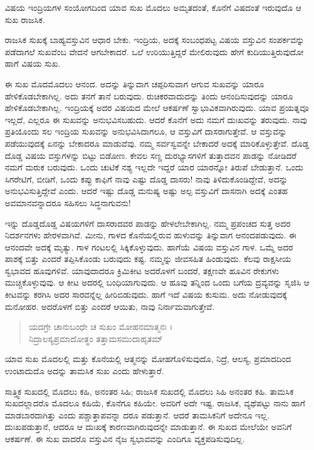 {\small ವಿಷಯ ಇಂದ್ರಿಯಗಳ ಸಂಯೋಗದಿಂದ ಯಾವ ಸುಖ ಮೊದಲು ಅಮೃತದಂತೆ, ಕೊನೆಗೆ ವಿಷದಂತೆ ಇರುವುದೊ ಆ ಸುಖ ರಾಜಸಿಕ.}

ರಾಜಸಿಕ ಸುಖಕ್ಕೆ ಬಾಹ್ಯವಸ್ತುವಿನ ಆಧಾರ ಬೇಕು. ಇಂದ್ರಿಯ, ಅದಕ್ಕೆ ಸಂಬಂಧಪಟ್ಟ ವಿಷಯ ವಸ್ತುವಿನ ಸಂಪರ್ಕವನ್ನು ಪಡೆದಾಗಲೆ ಸುಖವೆಂಬ ವೇದನೆ ಆಗಬೇಕಾದರೆ. ಒಲೆ ಉರಿಯುತ್ತಿದ್ದರೆ ಮೇಲಿರುವುದು ಹೇಗೆ ಕುದಿಯುತ್ತಿರುವುದೋ ಹಾಗೆ ವಿಷಯ ಸುಖ.

ಈ ಸುಖ ಮೊದಮೊದಲು ಆನಂದ. ಅದನ್ನು ತಿನ್ನುವಾಗ ಚಪ್ಪರಿಸುವಾಗ ಆಗುವ ಸುಖವನ್ನು ಯಾರೂ ಹೇಳಿಕೊಡಬೇಕಾಗಿಲ್ಲ. ಅದು ತನಗೆ ತಾನೆ ಬರುವುದು. ರುಚಿಕರವಾದುದನ್ನು ತಿಂದು ಆನಂದಿಸುವುದನ್ನು ಯಾರೂ ಹೇಳಿಕೊಡಬೇಕಾಗಿಲ್ಲ. ಇಂದ್ರಿಯಕ್ಕೆ ಅದರ ವಿಷಯದ ಮೇಲೆ ಆಕರ್ಷಣೆ ಸ್ವಾಭಾವಿಕವಾಗಿರುವುದು. ಯಾವ ಪ್ರಯತ್ನವೂ ಇಲ್ಲದೆ, ಎಲ್ಲರೂ ಈ ಸುಖವನ್ನು ಅನುಭವಿಸಬಹುದು. ಆದರೆ ಕೊನೆಗೆ ಅದು ನಮಗೆ ದುಃಖವನ್ನು ತರುವುದು. ನಾವು ಪ್ರತಿಯೊಂದು ಸಲ ಇಂದ್ರಿಯ ಸುಖವನ್ನು ಅನುಭವಿಸಿದಾಗಲೂ, ಆ ವಸ್ತುವಿಗೆ ದಾಸರಾಗುತ್ತೇವೆ. ಆ ವಸ್ತುವನ್ನು ಪಡೆಯುವುದಕ್ಕೆ ಏನನ್ನು ಬೇಕಾದರೂ ಮಾಡುವೆವು. ನಮ್ಮ ಸರ್ವಸ್ವವನ್ನೇ ಬೇಕಾದರೆ ಅದಕ್ಕೆ ಮಾರಿಕೊಳ್ಳುತ್ತೇವೆ. ದೊಡ್ಡ ದೊಡ್ಡ ವಿಷಯ ವಸ್ತುಗಳನ್ನು ಬಿಟ್ಟು ಬಿಡೋಣ. ಕೇವಲ ಸಣ್ಣ ದುರಭ್ಯಾಸಗಳಿಗೆ ತುತ್ತಾದವನ ಪಾಡನ್ನು ನೋಡಿದರೆ ನಮಗೆ ಮರುಕ ಬರುವುದು. ಒಂದು ಚುಟಿಕೆ ನಶ್ಯ ಇಲ್ಲದೇ ಇದ್ದರೆ ಯಾರ ಯಾರನ್ನೋ ತಿರುಪೆ ಬೇಡುತ್ತಾನೆ. ಒಂದು ಸಿಗರೇಟಿಗೆ, ಬೀಡಿಗೆ, ಒಂದು ಕಪ್ಪು ಕಾಫಿಗೆ ನಾವು ಎಷ್ಟು ದೊಡ್ಡ ದಾಸರು! ನಾವು ತಿಳಿದುಕೊಂಡಿದ್ದೇವೆ, ಅದನ್ನು ಅನುಭವಿಸುತ್ತಿದ್ದೇವೆ ಎಂದು. ಆದರೆ ಇಷ್ಟು ದೊಡ್ಡ ಮನುಷ್ಯ ಅಷ್ಟು ಅಲ್ಪ ವಸ್ತುವಿಗೆ ದಾಸನಾಗಿ ಅದಕ್ಕೆ ಎಂತಹ ಅವಮಾನವನ್ನಾದರೂ ಸಹಿಸಲು ಸಿದ್ಧನಾಗುವನು!

ಇನ್ನು ದೊಡ್ಡದೊಡ್ಡ ವಿಷಯಗಳಿಗೆ ದಾಸರಾದವರ ಪಾಡನ್ನು ಹೇಳಲೇಬೇಕಾಗಿಲ್ಲ. ನಮ್ಮ ಪ್ರಪಂಚದ ಸುತ್ತ ಅದರ ನಿದರ್ಶನಗಳು ಹೇರಳವಾಗಿವೆ. ಮೀನು, ಗಾಳದ ಕೊನೆಯಲ್ಲಿರುವ ಹುಳುವನ್ನು ತಿನ್ನುವಾಗ ಆನಂದಪಡುವುದು. ಈ ಆನಂದವೇ ಅದಕ್ಕೆ ಮೃತ್ಯು. ಗಾಳ ಗಂಟಲಲ್ಲಿ ಸಿಕ್ಕಿಕೊಳ್ಳುವುದು. ಹಾಗೆಯೆ ವಿಷಯ ವಸ್ತುವಿನ ಗಾಳ. ಒಮ್ಮೆ ಅದರ ಪಾಶಕ್ಕೆ ಬಿತ್ತು ಎಂದರೆ ತಪ್ಪಿಸಿಕೊಂಡು ಬರುವುದು ಕಷ್ಟ. ನಮ್ಮನ್ನು ಜೀವಸಹಿತ ಹಿಂಡುವುದು. ಕೆಲವು ರಾಕ್ಷಸೀಯ ಸ್ವಭಾವದ ಹೂವುಗಳಿವೆ. ಯಾವುದಾದರೂ ಕ್ರಿಮಿಕೀಟ ಅದರೊಳಗೆ ಬಂದರೆ, ತಕ್ಷಣವೇ ಹೂವಿನ ರೇಕುಗಳು ಮುಚ್ಚಿಕೊಳ್ಳುವುವು. ಆ ಕೀಟ ಅದರಲ್ಲಿ ಬಂಧಿಯಾಗುವುದು. ಆ ಹೂವು ತನ್ನಿಂದ ಒಂದು ಬಗೆಯ ದ್ರವ್ಯವನ್ನು ಸೃಜಿಸಿ ಆ ಕೀಟವನ್ನು ಕರಗಿಸಿ ಅದರ ಸಾರವನ್ನೆಲ್ಲ ಹೀರಿಬಿಡುವುದು. ಹಾಗೆ ಇದೆ ವಿಷಯ ಕುಸುಮ. ಅದು ನೋಡುವುದಕ್ಕೆ ಮನೋಹರ. ಅದರೊಳಗೆ ಬಿತ್ತು ಎಂದರೆ ಆಯಿತು, ನಾವು ನಿರ್ನಾಮವಾಗುತ್ತೇವೆ.

\begin{verse}
ಯದಗ್ರೇ ಚಾನುಬಂಧೇ ಚ ಸುಖಂ ಮೋಹನಮಾತ್ಮನಃ ।\\ನಿದ್ರಾಲಸ್ಯಪ್ರಮಾದೋತ್ಥಂ ತತ್ತಾಮಸಮುದಾಹೃತಮ್ 
\end{verse}

{\small ಯಾವ ಸುಖ ಮೊದಲಲ್ಲಿ ಮತ್ತು ಕೊನೆಯಲ್ಲಿ ಆತ್ಮನನ್ನು ಮೋಹಗೊಳಿಸುವುದೊ, ನಿದ್ರೆ, ಆಲಸ್ಯ, ಪ್ರಮಾದದಿಂದ ಉಂಟಾದುದೊ ಅದನ್ನು ತಾಮಸಿಕ ಸುಖ ಎಂದು ಹೇಳುತ್ತಾರೆ.}

ಸಾತ್ತ್ವಿಕ ಸುಖದಲ್ಲಿ ಮೊದಲು ಕಹಿ, ಅನಂತರ ಸಿಹಿ; ರಾಜಸಿಕ ಸುಖದಲ್ಲಿ ಮೊದಲು ಸಿಹಿ ಅನಂತರ ಕಹಿ. ತಾಮಸಿಕ ಸುಖದಲ್ಲಾದರೊ ಮೊದಲೂ ಕಹಿಯೆ, ಕೊನೆಗೂ ಕಹಿಯೇ. ಅವರಿಗೆ ಅದೇ ಇಷ್ಟ. ರಾಜಸಿಕ, ವ್ಯಥೆಪಟ್ಟು ನಾನು ಹಾಗೆ ಮಾಡಬಾರದಾಗಿತ್ತು ಎಂದು ಪಶ್ಚಾತ್ತಾಪವನ್ನಾ ದರೂ ಪಡುತ್ತಾನೆ. ಆದರೆ ತಾಮಸಿಕನಿಗೆ ಅದೇನೂ ಇಲ್ಲ. ದುಃಖಪಡುತ್ತಾನೆ, ಆದರೂ ಆ ದುಃಖಕ್ಕೆ ಕಾರಣವಾಗಿರುವುದನ್ನೇ ಮಾಡುತ್ತಾನೆ. ಈ ಸುಖದ ಮೇಲೆಯೇ ಅವನಿಗೆ ಆಕರ್ಷಣೆ. ಈ ಸುಖ ವಾದರೊ ವಸ್ತುವಿನ ನೈಜ ಸ್ವಭಾವವನ್ನು ಎಂದಿಗೂ ವ್ಯಕ್ತಪಡಿಸುವುದಿಲ್ಲ.

